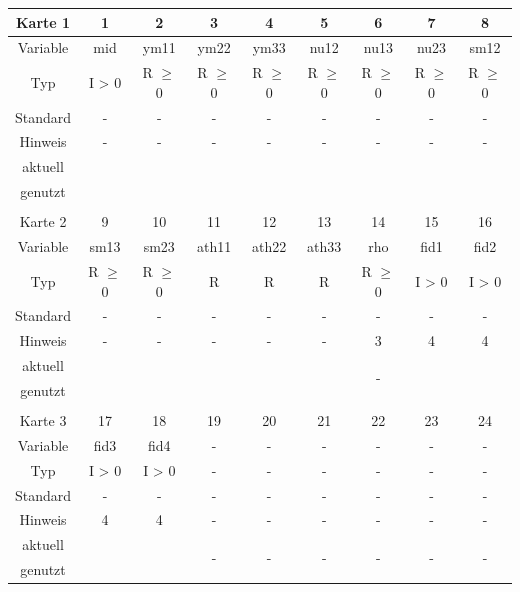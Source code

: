 \documentclass[11pt,titlepage,listof=totoc,bibliography=totoc,twoside]{scrreprt}
\begin{document}
{{\begin{table}[htbp]
\centering
\begin{tabularx}{\textwidth}{cCCCcCCCC}
\toprule
Karte 1         & 1     & 2      & 3       & 4       & 5     & 6     & 7    & 8     \\
\midrule
Variable        & mid   & ym11   & ym22    & ym33    & nu12  & nu13  & nu23 & sm12  \\
Typ             & I > 0 & R $\geq$ 0 & R $\geq$ 0 & R $\geq$ 0 & R $\geq$ 0 & R $\geq$ 0 & R $\geq$ 0 & R $\geq$ 0  \\
Standard        & -     & -      & -       & -       & -     & -     & -    & -     \\
Hinweis         & -     & -      & -       & -       & -     & -     & -    & -     \\
aktuell         &  &  &  &  &  &   &   &  \\
genutzt \\
\\
Karte 2         & 9     & 10     & 11      & 12      & 13    & 14    & 15   & 16    \\
\midrule
Variable        & sm13  & sm23   & ath11   & ath22   & ath33 & rho   & fid1 & fid2  \\
Typ             & R $\geq$ 0 & R $\geq$ 0 & R      & R      & R    & R $\geq$ 0 & I > 0 & I > 0 \\
Standard        & -     & -      & -       & -       & -     & -     & -    & -     \\
Hinweis         & -     & -      & -       & -       & -     & 3     & 4    & 4     \\
aktuell         &  &  &  &  &  &  &  &  \\
genutzt \\
\\
Karte 3         & 17    & 18     & 19      & 20      & 21    & 22    & 23   & 24    \\
\midrule
Variable        & fid3  & fid4   & -       & -       & -     & -     & -    & -     \\
Typ             & I > 0 & I > 0  & -       & -       & -     & -     & -    & -     \\
Standard        & -     & -      & -       & -       & -     & -     & -    & -     \\
Hinweis         & 4     & 4      & -       & -       & -     & -     & -    & -     \\
aktuell         &  &  &  &  &  &  &  &  \\
genutzt \\
\bottomrule
\end{tabularx}
\end{table}

}}
\end{document}

